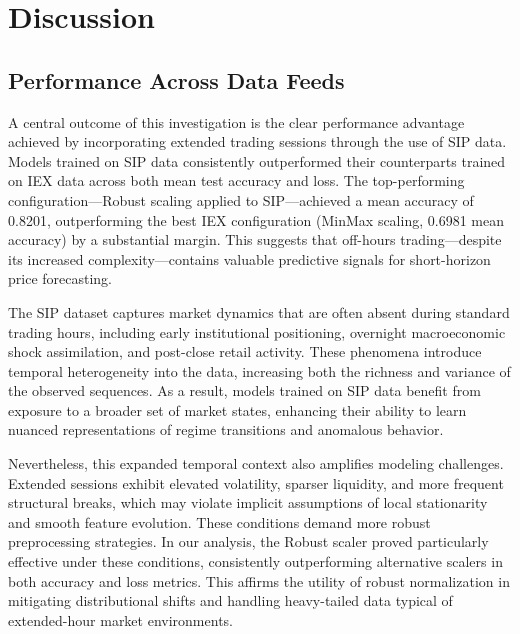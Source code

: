 \documentclass[letterpaper]{article}
\begin{document}


\section{Discussion}

\subsection{Performance Across Data Feeds} 

A central outcome of this investigation is the clear performance advantage achieved by incorporating extended trading sessions through the use of SIP data. Models trained on SIP data consistently outperformed their counterparts trained on IEX data across both mean test accuracy and loss. The top-performing configuration—Robust scaling applied to SIP—achieved a mean accuracy of 0.8201, outperforming the best IEX configuration (MinMax scaling, 0.6981 mean accuracy) by a substantial margin. This suggests that off-hours trading—despite its increased complexity—contains valuable predictive signals for short-horizon price forecasting.

The SIP dataset captures market dynamics that are often absent during standard trading hours, including early institutional positioning, overnight macroeconomic shock assimilation, and post-close retail activity. These phenomena introduce temporal heterogeneity into the data, increasing both the richness and variance of the observed sequences. As a result, models trained on SIP data benefit from exposure to a broader set of market states, enhancing their ability to learn nuanced representations of regime transitions and anomalous behavior.

Nevertheless, this expanded temporal context also amplifies modeling challenges. Extended sessions exhibit elevated volatility, sparser liquidity, and more frequent structural breaks, which may violate implicit assumptions of local stationarity and smooth feature evolution. These conditions demand more robust preprocessing strategies. In our analysis, the Robust scaler proved particularly effective under these conditions, consistently outperforming alternative scalers in both accuracy and loss metrics. This affirms the utility of robust normalization in mitigating distributional shifts and handling heavy-tailed data typical of extended-hour market environments.
\end{document}

